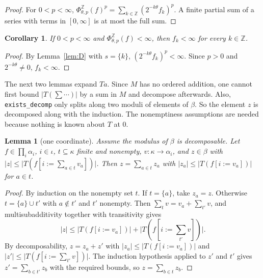 \documentclass[11pt]{article}
\newtheorem{lemma}[theorem]{Lemma}
\newtheorem{corollary}[theorem]{Corollary}
\theoremstyle{definition}
\theoremstyle{remark}
\newcommand{\abs}[1]{\lvert #1\rvert}
\newcommand{\Z}{\mathbb Z}
\newcommand{\upd}[3]{#1[#2 := #3]}
\begin{document}
\begin{proof}
  For \(0<p<\infty\), \(\Phi^{\Z}_{\theta,p}(f)^p = \sum_{k\in\Z}(2^{-k\theta}f_k)^p\). A
  finite partial sum of a series with terms in \([0,\infty]\) is at most the full sum.
\end{proof}

\begin{corollary}\label{cor:D}
  If \(0<p<\infty\) and \(\Phi^{\Z}_{\theta,p}(f)<\infty\), then \(f_k<\infty\) for every
  \(k\in\Z\).
\end{corollary}

\begin{proof}
  By Lemma~\ref{lem:D} with \(s = \{k\}\), \((2^{-k\theta}f_k)^p<\infty\). Since \(p>0\) and
  \(2^{-k\theta}\ne0\), \(f_k<\infty\).
\end{proof}

The next two lemmas expand \(Ta\). Since \(M\) has no ordered addition, one cannot first bound
\(\abs{T(\sum\cdots)}\) by a sum in \(M\) and decompose afterwards. Also,
\texttt{exists\_decomp} only splits along two moduli of elements of \(\beta\). So the element
\(z\) is decomposed along with the induction. The nonemptiness assumptions are needed because
nothing is known about \(T\) at \(0\).

\begin{lemma}[one coordinate]\label{lem:A1}
  Assume the modulus of \(\beta\) is decomposable. Let \(f\in\prod_i\alpha_i\),
  \(i\in\iota\), \(t\subseteq\kappa\) finite and nonempty, \(v\colon\kappa\to\alpha_i\), and
  \(z\in\beta\) with \(\abs{z}\le\abs{T(\upd{f}{i}{\sum_{a\in t}v_a})}\). Then
  \(z = \sum_{a\in t}z_a\) with \(\abs{z_a}\le\abs{T(\upd{f}{i}{v_a})}\) for \(a\in t\).
\end{lemma}

\begin{proof}
  By induction on the nonempty set \(t\). If \(t = \{a\}\), take \(z_a = z\). Otherwise
  \(t = \{a\}\cup t'\) with \(a\notin t'\) and \(t'\) nonempty. Then
  \(\sum_t v = v_a + \sum_{t'}v\), and multisubadditivity together with transitivity gives
  \[
    \abs{z} \le \abs{T(\upd{f}{i}{v_a})} + \abs{T(\upd{f}{i}{\textstyle\sum_{t'}v})}.
  \]
  By decomposability, \(z = z_a + z'\) with \(\abs{z_a}\le\abs{T(\upd{f}{i}{v_a})}\) and
  \(\abs{z'}\le\abs{T(\upd{f}{i}{\sum_{t'}v})}\). The induction hypothesis applied to
  \(z'\) and \(t'\) gives \(z' = \sum_{b\in t'}z_b\) with the required bounds, so
  \(z = \sum_{b\in t}z_b\).
\end{proof}
\end{document}
